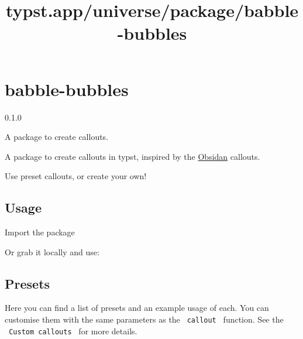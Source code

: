 \title{typst.app/universe/package/babble-bubbles}

\label{banner}
\section{babble-bubbles}\label{babble-bubbles}

{ 0.1.0 }

A package to create callouts.

\label{readme}
A package to create callouts in typst, inspired by the
\href{https://obsidian.md/}{Obsidan} callouts.

Use preset callouts, or create your own!


\subsection{Usage}\label{usage}

Import the package

\begin{Shaded}
\begin{Highlighting}[]
\end{Highlighting}
\end{Shaded}

Or grab it locally and use:

\begin{Shaded}
\begin{Highlighting}[]
\end{Highlighting}
\end{Shaded}

\subsection{Presets}\label{presets}

Here you can find a list of presets and an example usage of each. You
can customise them with the same parameters as the \texttt{\ callout\ }
function. See the \texttt{\ Custom\ callouts\ } for more details.

\begin{Shaded}
\begin{Highlighting}[]







\end{Highlighting}
\end{Shaded}

